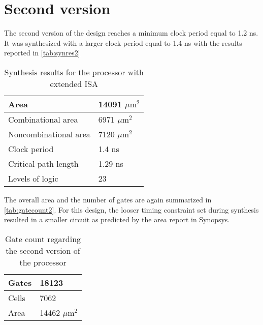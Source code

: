 \section{Second version}
The second version of the design reaches a minimum clock period equal to 1.2 ns. It was synthesized with a larger clock period equal to 1.4 ns with the results reported in \autoref{tab:synres2}
\begin{table}[h]
	\centering
	\begin{tabular}{|l|l|}
		\hline
		Area & 14091 $\mu\textrm{m}^2$\\\hline
		Combinational area &  6971 $\mu\textrm{m}^2$\\\hline
		Noncombinational area & 7120 $\mu\textrm{m}^2$\\\hline
		Clock period &  1.4 ns\\\hline
		Critical path length & 1.29 ns\\\hline
		Levels of logic & 23\\\hline
		
	\end{tabular}

	\caption{Synthesis results for the processor with extended ISA}
	\label{tab:synres2}
\end{table}
The overall area and the number of gates are again summarized in \autoref{tab:gatecount2}. For this design, the looser timing constraint set during synthesis resulted in a smaller circuit as predicted by the area report in Synopsys.
\begin{table}[h]
	\centering
	\begin{tabular}{|l|l|}\hline
		Gates &     18123 \\\hline Cells &   7062\\\hline Area &   14462 $\mu\textrm{m}^2$\\\hline
	\end{tabular}
	\caption{Gate count regarding the second version of the processor}
	\label{tab:gatecount2}
\end{table}
